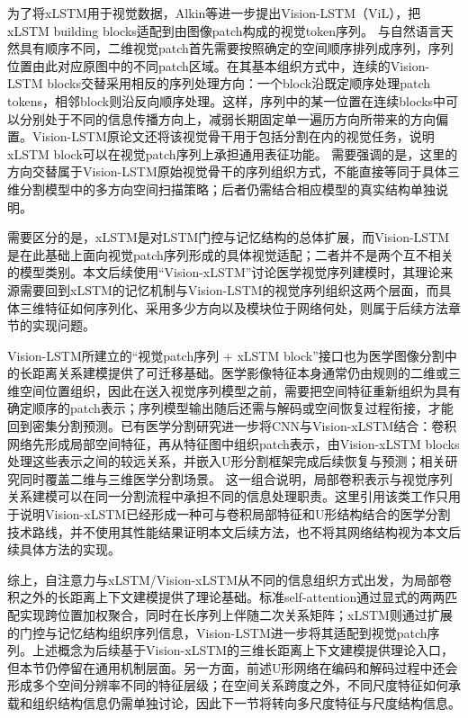 为了将xLSTM用于视觉数据，Alkin等进一步提出Vision-LSTM（ViL），把xLSTM building blocks适配到由图像patch构成的视觉token序列。\cite{alkin2025visionlstm} 与自然语言天然具有顺序不同，二维视觉patch首先需要按照确定的空间顺序排列成序列，序列位置由此对应原图中的不同patch区域。在其基本组织方式中，连续的Vision-LSTM blocks交替采用相反的序列处理方向：一个block沿既定顺序处理patch tokens，相邻block则沿反向顺序处理。这样，序列中的某一位置在连续blocks中可以分别处于不同的信息传播方向上，减弱长期固定单一遍历方向所带来的方向偏置。Vision-LSTM原论文还将该视觉骨干用于包括分割在内的视觉任务，说明xLSTM block可以在视觉patch序列上承担通用表征功能。\cite{alkin2025visionlstm} 需要强调的是，这里的方向交替属于Vision-LSTM原始视觉骨干的序列组织方式，不能直接等同于具体三维分割模型中的多方向空间扫描策略；后者仍需结合相应模型的真实结构单独说明。

需要区分的是，xLSTM是对LSTM门控与记忆结构的总体扩展，而Vision-LSTM是在此基础上面向视觉patch序列形成的具体视觉适配；二者并不是两个互不相关的模型类别。本文后续使用“Vision-xLSTM”讨论医学视觉序列建模时，其理论来源需要回到xLSTM的记忆机制与Vision-LSTM的视觉序列组织这两个层面，而具体三维特征如何序列化、采用多少方向以及模块位于网络何处，则属于后续方法章节的实现问题。

Vision-LSTM所建立的“视觉patch序列 + xLSTM block”接口也为医学图像分割中的长距离关系建模提供了可迁移基础。医学影像特征本身通常仍由规则的二维或三维空间位置组织，因此在送入视觉序列模型之前，需要把空间特征重新组织为具有确定顺序的patch表示；序列模型输出随后还需与解码或空间恢复过程衔接，才能回到密集分割预测。已有医学分割研究进一步将CNN与Vision-xLSTM结合：卷积网络先形成局部空间特征，再从特征图中组织patch表示，由Vision-xLSTM blocks处理这些表示之间的较远关系，并嵌入U形分割框架完成后续恢复与预测；相关研究同时覆盖二维与三维医学分割场景。\cite{dutta2025visionxlstmunet} 这一组合说明，局部卷积表示与视觉序列关系建模可以在同一分割流程中承担不同的信息处理职责。这里引用该类工作只用于说明Vision-xLSTM已经形成一种可与卷积局部特征和U形结构结合的医学分割技术路线，并不使用其性能结果证明本文后续方法，也不将其网络结构视为本文后续具体方法的实现。

综上，自注意力与xLSTM/Vision-xLSTM从不同的信息组织方式出发，为局部卷积之外的长距离上下文建模提供了理论基础。标准self-attention通过显式的两两匹配实现跨位置加权聚合，同时在长序列上伴随二次关系矩阵；xLSTM则通过扩展的门控与记忆结构组织序列信息，Vision-LSTM进一步将其适配到视觉patch序列。上述概念为后续基于Vision-xLSTM的三维长距离上下文建模提供理论入口，但本节仍停留在通用机制层面。另一方面，前述U形网络在编码和解码过程中还会形成多个空间分辨率不同的特征层级；在空间关系跨度之外，不同尺度特征如何承载和组织结构信息仍需单独讨论，因此下一节将转向多尺度特征与尺度结构信息。

